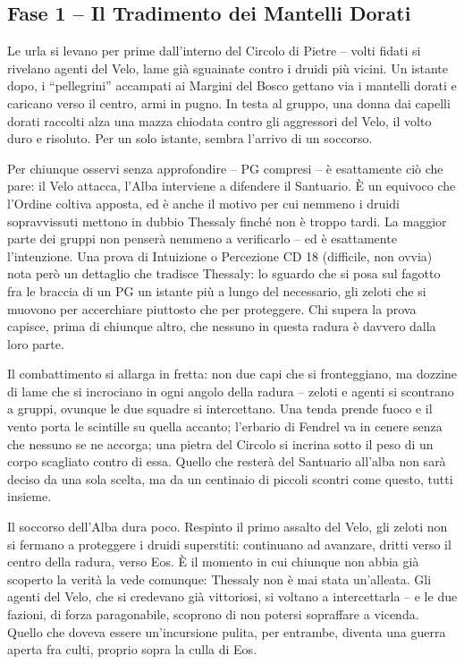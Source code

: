 \subsection{Fase 1 -- Il Tradimento dei Mantelli Dorati}

\begin{DndReadAloud}[]
  Le urla si levano per prime dall'interno del Circolo di Pietre -- volti fidati si rivelano agenti del Velo, lame già sguainate contro i druidi più vicini. Un istante dopo, i ``pellegrini'' accampati ai Margini del Bosco gettano via i mantelli dorati e caricano verso il centro, armi in pugno. In testa al gruppo, una donna dai capelli dorati raccolti alza una mazza chiodata contro gli aggressori del Velo, il volto duro e risoluto. Per un solo istante, sembra l'arrivo di un soccorso.
\end{DndReadAloud}

Per chiunque osservi senza approfondire -- PG compresi -- è esattamente ciò che pare: il Velo attacca, l'Alba interviene a difendere il Santuario. È un equivoco che l'Ordine coltiva apposta, ed è anche il motivo per cui nemmeno i druidi sopravvissuti mettono in dubbio Thessaly finché non è troppo tardi. La maggior parte dei gruppi non penserà nemmeno a verificarlo -- ed è esattamente l'intenzione. Una prova di Intuizione o Percezione CD 18 (difficile, non ovvia) nota però un dettaglio che tradisce Thessaly: lo sguardo che si posa sul fagotto fra le braccia di un PG un istante più a lungo del necessario, gli zeloti che si muovono per accerchiare piuttosto che per proteggere. Chi supera la prova capisce, prima di chiunque altro, che nessuno in questa radura è davvero dalla loro parte.

Il combattimento si allarga in fretta: non due capi che si fronteggiano, ma dozzine di lame che si incrociano in ogni angolo della radura -- zeloti e agenti si scontrano a gruppi, ovunque le due squadre si intercettano. Una tenda prende fuoco e il vento porta le scintille su quella accanto; l'erbario di Fendrel va in cenere senza che nessuno se ne accorga; una pietra del Circolo si incrina sotto il peso di un corpo scagliato contro di essa. Quello che resterà del Santuario all'alba non sarà deciso da una sola scelta, ma da un centinaio di piccoli scontri come questo, tutti insieme.

Il soccorso dell'Alba dura poco. Respinto il primo assalto del Velo, gli zeloti non si fermano a proteggere i druidi superstiti: continuano ad avanzare, dritti verso il centro della radura, verso Eos. È il momento in cui chiunque non abbia già scoperto la verità la vede comunque: Thessaly non è mai stata un'alleata. Gli agenti del Velo, che si credevano già vittoriosi, si voltano a intercettarla -- e le due fazioni, di forza paragonabile, scoprono di non potersi sopraffare a vicenda. Quello che doveva essere un'incursione pulita, per entrambe, diventa una guerra aperta fra culti, proprio sopra la culla di Eos.


